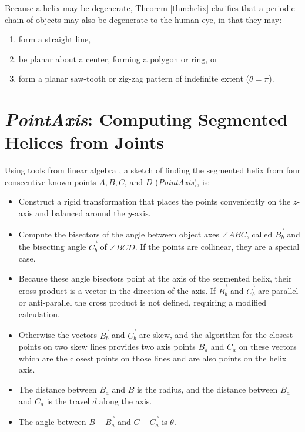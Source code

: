 \documentclass{svproc}
\begin{document}
Because a helix may be degenerate, Theorem \ref{thm:helix} clarifies that
a periodic chain of objects may also be degenerate to the human eye, in that they may:
\begin{enumerate}
\item form a straight line,
\item be planar about a center, forming a polygon or ring, or
\item form a planar saw-tooth or zig-zag pattern of indefinite extent ($\theta = \pi$).
\end{enumerate}

\section{{\em PointAxis}: Computing Segmented Helices from Joints}
\label{sec:pointaxis}

Using tools from linear algebra \cite{kahn1989defining}, a sketch of finding the segmented helix from
four consecutive known points $A,B,C$, and $D$ ({\em PointAxis}), is:
\begin{itemize}
\item Construct a rigid transformation that places the points conveniently on the $z$-axis and balanced
  around the $y$-axis.
\item Compute the bisectors of the angle between object axes $ \angle{ABC}$, called $\overrightarrow{B_b}$ and the
  bisecting angle $\overrightarrow{C_b}$ of $\angle{BCD}$.
  If the points are collinear, they are a special case.
\item Because these angle bisectors point at the axis of the segmented helix, their cross product is a vector
  in the direction of the axis. If $\overrightarrow{B_b}$ and $\overrightarrow{C_b}$ are parallel or anti-parallel the cross product is not defined, requiring a modified calculation.
\item  Otherwise the vectors $\overrightarrow{B_b}$ and $\overrightarrow{C_b}$ are skew, and the algorithm for the closest points on
  two skew lines provides two axis points $B_a$ and $C_a$ on these vectors which
  are the closest points on those lines and are also points on the helix axis.
\item The distance between $B_a$ and $B$ is the radius, and the distance between $B_a$ and $C_a$ is the travel $d$ along the axis.
  \item The angle between $\overrightarrow{B - B_a}$ and $\overrightarrow{C - C_a}$ is $\theta$.
\end{itemize}
\end{document}
